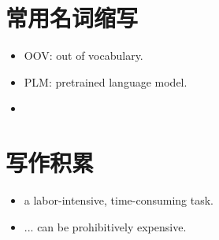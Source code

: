 \documentclass{article}
\begin{document}
\section{常用名词缩写}
\begin{itemize}
    \item OOV: out of vocabulary.
    \item PLM: pretrained language model.
    \item 
\end{itemize}

\section{写作积累}
\begin{itemize}
    \item a labor-intensive, time-consuming task.
    \item ... can be prohibitively expensive.
\end{itemize}
\end{document}
